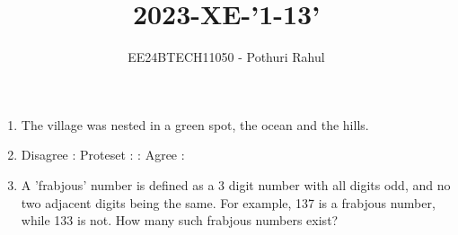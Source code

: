 \documentclass[journal]{IEEEtran}
\begin{document}

\vspace{3cm}
\title{2023-XE-'1-13'}
\author{EE24BTECH11050 - Pothuri Rahul}
{\let\newpage\relax\maketitle}
\renewcommand{\thefigure}{\theenumi}
\renewcommand{\thetable}{\theenumi}
\setlength{\intextsep}{10pt} %
\renewcommand{\thetable}{\theenumi}
\begin{enumerate}[start=1]
\item %
The village was nested in a green spot, \underline{\hspace{2cm}} the ocean and the hills.
\begin{enumerate}
\end{enumerate}
\item %
Disagree : Proteset : : Agree : \underline{\hspace{1.5cm}}
\begin{enumerate}
\end{enumerate}
\item %
A 'frabjous' number is defined as a 3 digit number with all digits odd, and no two adjacent digits being the same. For example, 137 is a frabjous number, while 133 is not. How many such frabjous numbers exist? 
\begin{enumerate}
\end{enumerate}
\end{enumerate}
\end{document}
